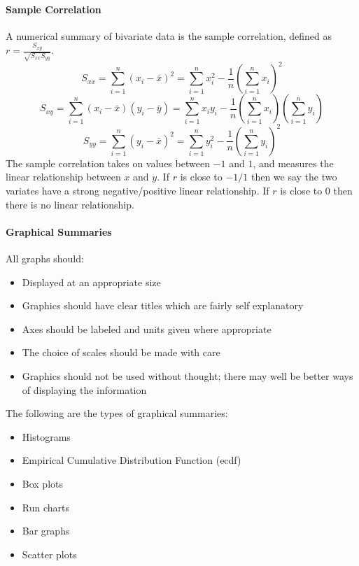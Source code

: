 \documentclass[10pt,letter]{article}
\theoremstyle{plain}
\theoremstyle{definition}
\begin{document}
\paragraph{Sample Correlation}
A numerical summary of bivariate data is the sample correlation, defined as $r=\frac{S_{xy}}{\sqrt{S_{xx}S_{yy}}}$. 
$$S_{xx}=\sum_{i=1}^n(x_i-\bar{x})^2=\sum_{i=1}^nx_i^2-\frac{1}{n}\left(\sum_{i=1}^nx_i\right)^2$$ 
$$S_{xy}=\sum_{i=1}^n(x_i-\bar{x})(y_i-\bar{y})=\sum_{i=1}^nx_iy_i-\frac{1}{n}\left(\sum_{i=1}^nx_i\right)\left(\sum_{i=1}^ny_i\right)$$
$$S_{yy}=\sum_{i=1}^n(y_i-\bar{x})^2=\sum_{i=1}^ny_i^2-\frac{1}{n}\left(\sum_{i=1}^ny_i\right)^2$$
The sample correlation takes on values between $-1$ and $1$, and measures the linear relationship between $x$ and $y$. If $r$ is close to $-1/1$ then we say the two variates have a strong negative/positive linear relationship. If $r$ is close to 0 then there is no linear relationship. 

\paragraph{Graphical Summaries}All graphs should: 
\begin{itemize}
    \item Displayed at an appropriate size 
    \item Graphics should have clear titles which are fairly self explanatory 
    \item Axes should be labeled and units given where appropriate 
    \item The choice of scales should be made with care 
    \item Graphics should not be used without thought; there may well be better ways of displaying the information
\end{itemize}

The following are the types of graphical summaries: 
\begin{itemize}
    \item Histograms 
    \item Empirical Cumulative Distribution Function (ecdf)
    \item Box plots
    \item Run charts 
    \item Bar graphs 
    \item Scatter plots
\end{itemize}
\end{document}
